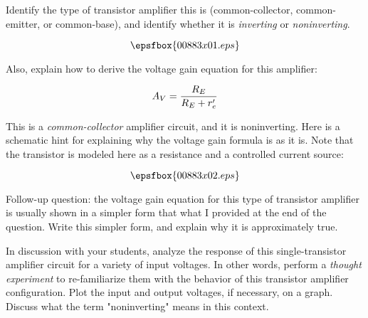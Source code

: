 

Identify the type of transistor amplifier this is (common-collector, common-emitter, or common-base), and identify whether it is {\it inverting} or {\it noninverting}.

$$\epsfbox{00883x01.eps}$$

Also, explain how to derive the voltage gain equation for this amplifier:

$$A_V = {R_E \over {R_E + r'_e}}$$







This is a {\it common-collector} amplifier circuit, and it is noninverting.  Here is a schematic hint for explaining why the voltage gain formula is as it is.  Note that the transistor is modeled here as a resistance and a controlled current source:

$$\epsfbox{00883x02.eps}$$

\vskip 10pt

Follow-up question: the voltage gain equation for this type of transistor amplifier is usually shown in a simpler form that what I provided at the end of the question.  Write this simpler form, and explain why it is approximately true.







In discussion with your students, analyze the response of this single-transistor amplifier circuit for a variety of input voltages.  In other words, perform a {\it thought experiment} to re-familiarize them with the behavior of this transistor amplifier configuration.  Plot the input and output voltages, if necessary, on a graph.  Discuss what the term "noninverting" means in this context.




